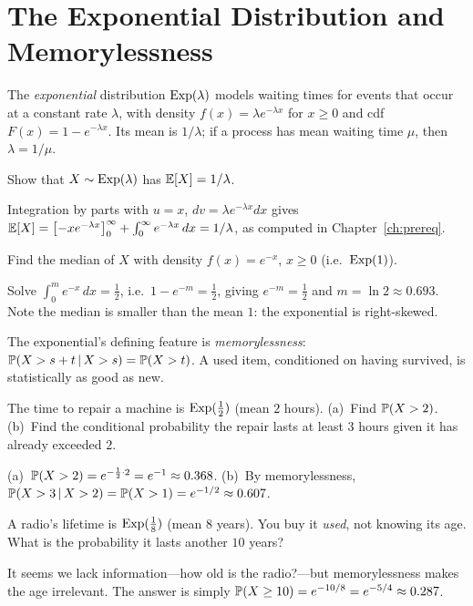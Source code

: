 \section{The Exponential Distribution and Memorylessness}

The \emph{exponential} distribution $\mathrm{Exp}(\lambda)$ models waiting times for
events that occur at a constant rate $\lambda$, with density
$f(x)=\lambda e^{-\lambda x}$ for $x\ge 0$ and cdf $F(x)=1-e^{-\lambda x}$. Its
mean is $1/\lambda$; if a process has mean waiting time $\mu$, then
$\lambda=1/\mu$.

\begin{example}
Show that $X\sim\mathrm{Exp}(\lambda)$ has $\mathbb{E}[X]=1/\lambda$.

\solution Integration by parts with $u=x$, $dv=\lambda e^{-\lambda x}dx$ gives
$\mathbb{E}[X]=\bigl[-xe^{-\lambda x}\bigr]_0^\infty+\int_0^\infty e^{-\lambda x}\,dx=1/\lambda$,
as computed in Chapter~\ref{ch:prereq}.
\end{example}

\begin{example}
Find the median of $X$ with density $f(x)=e^{-x}$, $x\ge 0$ (i.e.\ $\mathrm{Exp}(1)$).

\solution Solve $\int_0^m e^{-x}\,dx=\tfrac12$, i.e.\ $1-e^{-m}=\tfrac12$, giving
$e^{-m}=\tfrac12$ and $m=\ln 2\approx 0.693$. Note the median is smaller than the
mean $1$: the exponential is right-skewed.
\end{example}

The exponential's defining feature is \emph{memorylessness}:
$\mathbb{P}(X>s+t\,|\, X>s)=\mathbb{P}(X>t)$. A used item, conditioned on having survived,
is statistically as good as new.

\begin{example}
The time to repair a machine is $\mathrm{Exp}(\tfrac12)$ (mean $2$ hours). (a)~Find
$\mathbb{P}(X>2)$. (b)~Find the conditional probability the repair lasts at least $3$
hours given it has already exceeded $2$.

\solution (a)~$\mathbb{P}(X>2)=e^{-\frac12\cdot 2}=e^{-1}\approx 0.368$. (b)~By
memorylessness, $\mathbb{P}(X>3\,|\, X>2)=\mathbb{P}(X>1)=e^{-1/2}\approx 0.607$.
\end{example}

\begin{example}
A radio's lifetime is $\mathrm{Exp}(\tfrac18)$ (mean $8$ years). You buy it \emph{used},
not knowing its age. What is the probability it lasts another $10$ years?

\solution It seems we lack information—how old is the radio?—but memorylessness
makes the age irrelevant. The answer is simply
$\mathbb{P}(X\ge 10)=e^{-10/8}=e^{-5/4}\approx 0.287$.
\end{example}

